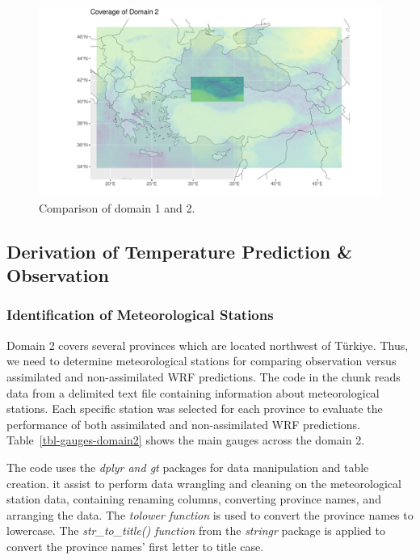 \documentclass[
  letterpaper,
  DIV=11,
  numbers=noendperiod,
  abstract]{scrartcl}
\begin{document}
\begin{figure}[H]

{\centering \includegraphics{WRF_pdf_files/figure-pdf/fig-domain2-1.pdf}

}

\caption{\label{fig-domain2}Comparison of domain 1 and 2.}

\end{figure}

\hypertarget{derivation-of-temperature-prediction-observation}{%
\subsection{Derivation of Temperature Prediction \&
Observation}\label{derivation-of-temperature-prediction-observation}}

\hypertarget{identification-of-meteorological-stations}{%
\subsubsection{Identification of Meteorological
Stations}\label{identification-of-meteorological-stations}}

Domain 2 covers several provinces which are located northwest of
Türkiye. Thus, we need to determine meteorological stations for
comparing observation versus assimilated and non-assimilated WRF
predictions. The code in the chunk reads data from a delimited text file
containing information about meteorological stations. Each specific
station was selected for each province to evaluate the performance of
both assimilated and non-assimilated WRF predictions.
Table~\ref{tbl-gauges-domain2} shows the main gauges across the domain
2.

The code uses the \emph{dplyr and gt} packages for data manipulation and
table creation. it assist to perform data wrangling and cleaning on the
meteorological station data, containing renaming columns, converting
province names, and arranging the data. The \emph{tolower function} is
used to convert the province names to lowercase. The
\emph{str\_to\_title() function} from the \emph{stringr} package is
applied to convert the province names' first letter to title case.
\end{document}
